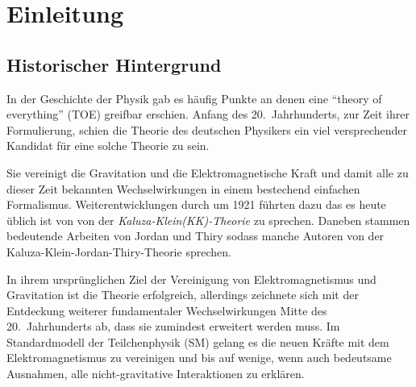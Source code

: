 \chapter{Einleitung}
\section{Historischer Hintergrund}
In der Geschichte der Physik gab es häufig Punkte an denen eine \enquote{theory
of everything} (TOE) greifbar erschien. Anfang des 20.\ Jahrhunderts, zur
Zeit ihrer Formulierung, schien die Theorie des deutschen Physikers  
ein viel versprechender Kandidat für eine solche Theorie zu sein.

Sie vereinigt die Gravitation und die Elektromagnetische Kraft und damit alle zu
dieser Zeit bekannten Wechselwirkungen in einem bestechend einfachen
Formalismus. Weiterentwicklungen durch  um 1921 führten dazu
das es heute üblich ist von von der \emph{Kaluza-Klein(KK)-Theorie} zu sprechen.
Daneben stammen bedeutende Arbeiten von Jordan und Thiry sodass manche Autoren
von der Kaluza-Klein-Jordan-Thiry-Theorie sprechen.

In ihrem ursprünglichen Ziel der Vereinigung von Elektromagnetismus und
Gravitation ist die Theorie erfolgreich, 
allerdings zeichnete sich mit der Entdeckung weiterer
fundamentaler Wechselwirkungen Mitte des 20.\ Jahrhunderts ab, dass 
sie zumindest erweitert werden muss.
Im Standardmodell der Teilchenphysik (SM) gelang es die neuen Kräfte mit dem
Elektromagnetismus zu vereinigen und bis auf wenige, wenn auch
bedeutsame Ausnahmen, alle nicht-gravitative Interaktionen zu erklären. 

